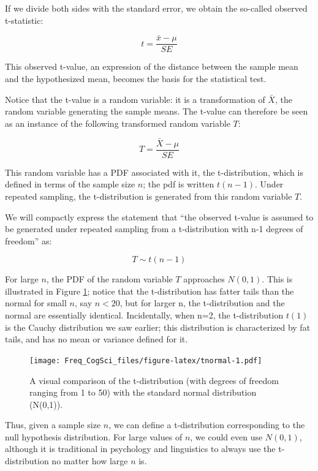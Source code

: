 \documentclass[12pt,]{krantz}
\begin{document}
If we divide both sides with the standard error, we obtain the so-called observed t-statistic:

\begin{equation}
t  = \frac{\bar{x} - \mu}{SE}
\end{equation}

This observed t-value, an expression of the distance between the sample mean and the hypothesized mean, becomes the basis for the statistical test.

Notice that the t-value is a random variable: it is a transformation of \(\bar{X}\), the random variable generating the sample means. The t-value can therefore be seen as an instance of the following transformed random variable \(T\):

\begin{equation}
T  = \frac{\bar{X} - \mu}{SE}
\end{equation}

This random variable has a PDF associated with it, the t-distribution, which is defined in terms of the sample size \(n\); the pdf is written \(t(n-1)\). Under repeated sampling, the t-distribution is generated from this random variable \(T\).

We will compactly express the statement that ``the observed t-value is assumed to be generated under repeated sampling from a t-distribution with n-1 degrees of freedom'' as:

\begin{equation}
T \sim t(n-1)
\end{equation}

For large \(n\), the PDF of the random variable \(T\) approaches \(N(0,1)\). This is illustrated in Figure \ref{fig:tnormal}; notice that the t-distribution has fatter tails than the normal for small \(n\), say \(n<20\), but for larger n, the t-distribution and the normal are essentially identical. Incidentally, when n=2, the t-distribution \(t(1)\) is the Cauchy distribution we saw earlier; this distribution is characterized by fat tails, and has no mean or variance defined for it.

\begin{figure}
\centering
\texttt{[image: Freq\_CogSci\_files/figure-latex/tnormal-1.pdf]}
\caption{\label{fig:tnormal}A visual comparison of the t-distribution (with degrees of freedom ranging from 1 to 50) with the standard normal distribution (N(0,1)).}
\end{figure}

Thus, given a sample size \(n\), we can define a t-distribution corresponding to the null hypothesis distribution. For large values of \(n\), we could even use \(N(0,1)\), although it is traditional in psychology and linguistics to always use the t-distribution no matter how large \(n\) is.
\end{document}
